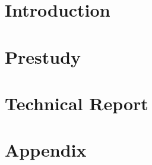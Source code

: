




\hypersetup{linkcolor=black}
\setcounter{tocdepth}{1}

\begin{abstract}
    
\end{abstract}

\tableofcontents

\part{Introduction}





\part{Prestudy}







\part{Technical Report}

%





\part{Appendix}
\begin{appendices}

% 
% 

% 

\printglossaries

\end{appendices}


